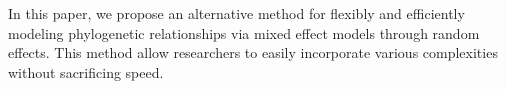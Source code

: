 \documentclass[12pt]{article}
\begin{document}
In this paper, we propose an alternative method for flexibly and efficiently modeling phylogenetic relationships via mixed effect models through random effects. 
This method allow researchers to easily incorporate various complexities without sacrificing speed.
\end{document}
